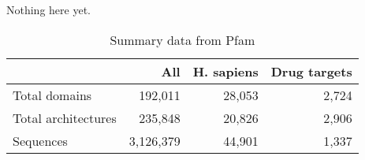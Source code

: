 		
% 
% 
% 
% 
% 
% 
	

Nothing here yet.

\begin{table}
	\begin{center}
		\sf
		\begin{tabular}{l r r r}
			& \textbf{All} & \textbf{H. sapiens} & \textbf{Drug targets}			\\
			\hline
			Total domains & 192,011 & 28,053 & 2,724						\\
			Total architectures & 235,848 & 20,826 & 2,906					\\	
			Sequences & 3,126,379 & 44,901 & 1,337							\\
			\hline
		\end{tabular}
		\caption{Summary data from Pfam}
	\end{center}
\end{table}

